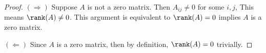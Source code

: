 \begin{Exercise}
\begin{proof}
$(\Longrightarrow)$
Suppose $A$ is not a zero matrix. Then $A_{i j}\neq 0$ for some $i,j$, This means $\rank(A)\neq 0$. This argument is equivalent to $\rank(A) = 0$ implies $A$ is a zero matrix.

\vspace{2ex}

$(\Longleftarrow)$
Since $A$ is a zero matrix, then by definition, $\rank(A) = 0$ trivially.
\end{proof}
\end{Exercise}